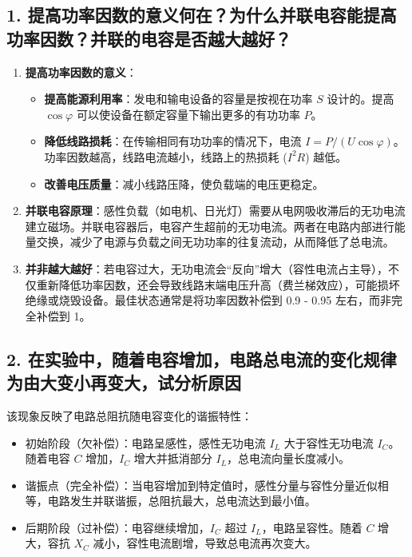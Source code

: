 \documentclass[]{../../templates/Report}%
\begin{document}
\begin{fullreportonly}
\subsection*{1. 提高功率因数的意义何在？为什么并联电容能提高功率因数？并联的电容是否越大越好？}
\begin{enumerate}
    \item \textbf{提高功率因数的意义}：
    \begin{itemize}
        \item \textbf{提高能源利用率}：发电和输电设备的容量是按视在功率 $S$ 设计的。提高 $\cos\varphi$ 可以使设备在额定容量下输出更多的有功功率 $P$。
        \item \textbf{降低线路损耗}：在传输相同有功功率的情况下，电流 $I = P/(U\cos\varphi)$。功率因数越高，线路电流越小，线路上的热损耗 ($I^2R$) 越低。
        \item \textbf{改善电压质量}：减小线路压降，使负载端的电压更稳定。
    \end{itemize}
    \item \textbf{并联电容原理}：感性负载（如电机、日光灯）需要从电网吸收滞后的无功电流建立磁场。并联电容器后，电容产生超前的无功电流。两者在电路内部进行能量交换，减少了电源与负载之间无功功率的往复流动，从而降低了总电流。
    \item \textbf{并非越大越好}：若电容过大，无功电流会“反向”增大（容性电流占主导），不仅重新降低功率因数，还会导致线路末端电压升高（费兰梯效应），可能损坏绝缘或烧毁设备。最佳状态通常是将功率因数补偿到 0.9 - 0.95 左右，而非完全补偿到 1。
\end{enumerate}

\subsection*{2. 在实验中，随着电容增加，电路总电流的变化规律为由大变小再变大，试分析原因}
该现象反映了电路总阻抗随电容变化的谐振特性：
\begin{itemize}
    \item 初始阶段（欠补偿）：电路呈感性，感性无功电流 $I_L$ 大于容性无功电流 $I_C$。随着电容 $C$ 增加，$I_C$ 增大并抵消部分 $I_L$，总电流向量长度减小。
    \item 谐振点（完全补偿）：当电容增加到特定值时，感性分量与容性分量近似相等，电路发生并联谐振，总阻抗最大，总电流达到最小值。
    \item 后期阶段（过补偿）：电容继续增加，$I_C$ 超过 $I_L$，电路呈容性。随着 $C$ 增大，容抗 $X_C$ 减小，容性电流剧增，导致总电流再次变大。
\end{itemize}


\end{fullreportonly}
\end{document}
